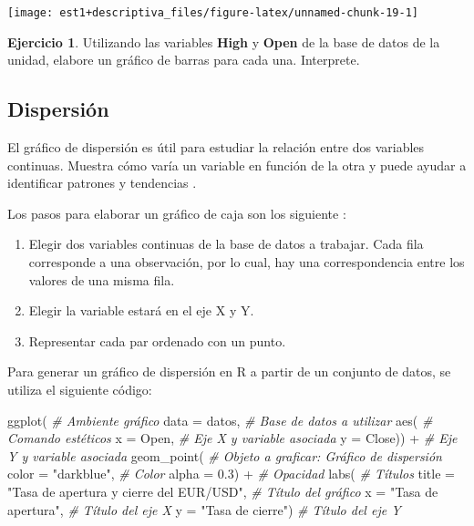 \documentclass[
]{book}
\newenvironment{Shaded}{\begin{snugshade}}{\end{snugshade}}
\newcommand{\AttributeTok}[1]{\textcolor[rgb]{0.77,0.63,0.00}{#1}}
\newcommand{\CommentTok}[1]{\textcolor[rgb]{0.56,0.35,0.01}{\textit{#1}}}
\newcommand{\FloatTok}[1]{\textcolor[rgb]{0.00,0.00,0.81}{#1}}
\newcommand{\FunctionTok}[1]{\textcolor[rgb]{0.00,0.00,0.00}{#1}}
\newcommand{\NormalTok}[1]{#1}
\newcommand{\SpecialCharTok}[1]{\textcolor[rgb]{0.00,0.00,0.00}{#1}}
\newcommand{\StringTok}[1]{\textcolor[rgb]{0.31,0.60,0.02}{#1}}
\providecommand{\tightlist}{%
  \setlength{\itemsep}{0pt}\setlength{\parskip}{0pt}}
\theoremstyle{definition}
\theoremstyle{definition}
\theoremstyle{definition}
\newtheorem{exercise}{Ejercicio}[chapter]
\theoremstyle{definition}
\theoremstyle{remark}
\begin{document}
\begin{center}\texttt{[image: est1+descriptiva\_files/figure-latex/unnamed-chunk-19-1]} \end{center}

\begin{exercise}
Utilizando las variables \textbf{High} y \textbf{Open} de la base de datos de la unidad, elabore un gráfico de barras para cada una. Interprete.
\end{exercise}

\hypertarget{dispersiuxf3n}{%
\subsection{Dispersión}\label{dispersiuxf3n}}

El gráfico de dispersión es útil para estudiar la relación entre dos variables continuas. Muestra cómo varía un variable en función de la otra y puede ayudar a identificar patrones y tendencias \citep{rowlingson2016data}.

Los pasos para elaborar un gráfico de caja son los siguiente \citep{healy2019data}:

\begin{enumerate}
\def\labelenumi{\arabic{enumi}.}
\tightlist
\item
  Elegir dos variables continuas de la base de datos a trabajar. Cada fila corresponde a una observación, por lo cual, hay una correspondencia entre los valores de una misma fila.
\item
  Elegir la variable estará en el eje X y Y.
\item
  Representar cada par ordenado con un punto.
\end{enumerate}

Para generar un gráfico de dispersión en R a partir de un conjunto de datos, se utiliza el siguiente código:

\begin{Shaded}
\begin{Highlighting}[]
\FunctionTok{ggplot}\NormalTok{( }\CommentTok{\# Ambiente gráfico}
  \AttributeTok{data =}\NormalTok{ datos, }\CommentTok{\# Base de datos a utilizar}
  \FunctionTok{aes}\NormalTok{( }\CommentTok{\# Comando estéticos}
    \AttributeTok{x =}\NormalTok{ Open, }\CommentTok{\# Eje X y variable asociada}
    \AttributeTok{y =}\NormalTok{ Close)) }\SpecialCharTok{+} \CommentTok{\# Eje Y y variable asociada}
  \FunctionTok{geom\_point}\NormalTok{( }\CommentTok{\# Objeto a graficar: Gráfico de dispersión}
    \AttributeTok{color =} \StringTok{"darkblue"}\NormalTok{, }\CommentTok{\# Color}
    \AttributeTok{alpha =} \FloatTok{0.3}\NormalTok{) }\SpecialCharTok{+} \CommentTok{\# Opacidad}
  \FunctionTok{labs}\NormalTok{( }\CommentTok{\# Títulos}
    \AttributeTok{title =} \StringTok{"Tasa de apertura y cierre del EUR/USD"}\NormalTok{, }\CommentTok{\# Título del gráfico}
    \AttributeTok{x =} \StringTok{"Tasa de apertura"}\NormalTok{, }\CommentTok{\# Título del eje X}
    \AttributeTok{y =} \StringTok{"Tasa de cierre"}\NormalTok{) }\CommentTok{\# Título del eje Y}
\end{Highlighting}
\end{Shaded}
\end{document}
